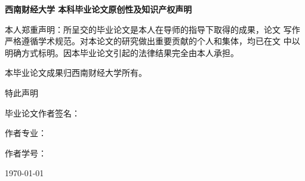 \newpage
\thispagestyle{empty} %
\begin{center}
    \bfseries
    西南财经大学\break
    本科毕业论文原创性及知识产权声明
\end{center}

\vspace{20pt}

本人郑重声明：所呈交的毕业论文是本人在导师的指导下取得的成果，论文
写作严格遵循学术规范。对本论文的研究做出重要贡献的个人和集体，均已在文
中以明确方式标明。因本毕业论文引起的法律结果完全由本人承担。

本毕业论文成果归西南财经大学所有。
\vspace{\baselineskip}

特此声明
\vspace{\fill}
\begin{flushright}
毕业论文作者签名：\hspace*{4em}

作者专业：\hspace*{4em}

作者学号：\hspace*{4em}

\today
\end{flushright}